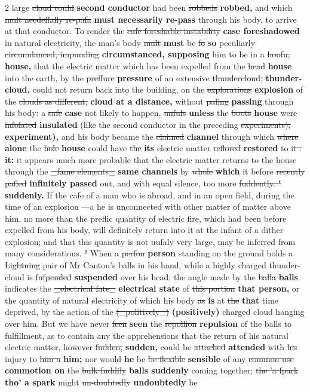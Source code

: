 \documentclass[10pt]{article}
\begin{document}
\begin{multicols}{2}
large \sout{cloud could} \textbf{second conductor} had been \sout{robbeds} \textbf{robbed,} and which \sout{mult needeffally re-pafa} \textbf{must necessarily re-pass} through his body, to arrive at that conductor. To render the \sout{cafe foreshable instability} \textbf{case foreshadowed} in natural electricity, the man's body \sout{mult} \textbf{must} be \sout{fo} \textbf{so} peculiarly \sout{circumdanced, impunding} \textbf{circumstanced, supposing} him to be in a \sout{hoofu,} \textbf{house,} that the electric matter which has been expelled from the \sout{head} \textbf{house} into the earth, by the \sout{preffure} \textbf{pressure} of an extensive \sout{thundercloud,} \textbf{thunder-cloud,} could not return back into the building, on the \sout{explorations} \textbf{explosion} of the \sout{clouds as different,} \textbf{cloud at a distance,} without \sout{paling} \textbf{passing} through his body: a \sout{safe} \textbf{case} not likely to happen, \sout{unfuls} \textbf{unless} the \sout{boots} \textbf{house} were \sout{infolated} \textbf{insulated} (like the second conductor in the preceding \sout{experiments),} \textbf{experiment),} and his body became the \sout{claimed} \textbf{channel} through which \sout{where} \textbf{alone} the \sout{hole} \textbf{house} could have \sout{the} \textbf{its} electric matter \sout{reflored} \textbf{restored} to \sout{it :} \textbf{it:} it appears much more probable that the electric matter returns to the house through the \sout{\_fame elements\_} \textbf{same channels} by \sout{whole} \textbf{which} it before \sout{recently pafled} \textbf{infinitely passed} out, and with equal silence, too more \sout{fuddently. "} \textbf{suddenly.} If the cafe of a man who is abroad, and in an open field, during the time of an explosion —a he is unconnected with other matter of matter above him, no more than the preflic quantity of electric fire, which had been before expelled from his body, will definitely return into it at the infant of a dither explosion; and that this quantity is not uufaly very large, may be inferred from many considerations. \sout{"} When a \sout{perfon} \textbf{person} standing on the ground holds a \sout{Lightning} pair of Mr Canton's balls in his hand, while a highly charged thunder-cloud is \sout{fufpended} \textbf{suspended} over his head; the angle made by the \sout{balla} \textbf{balls} indicates the \sout{\_electrical fate\_} \textbf{electrical state} of \sout{this portion} \textbf{that person,} or the quantity of natural electricity of which his body \sout{as} \textbf{is} at \sout{the} \textbf{that} time deprived, by the action of the \sout{(\_politively\_)} \textbf{(positively)} charged cloud hanging over him. But we have never \sout{feen} \textbf{seen} the \sout{repollion} \textbf{repulsion} of the balls to fulfillment, as to contain any the apprehensions that the return of his natural electric matter, however \sout{fudden,} \textbf{sudden,} could be \sout{attached} \textbf{attended} with \sout{his} injury to \sout{him a} \textbf{him;} nor would \textbf{he} be \sout{be flexible} \textbf{sensible} of any \sout{common use} \textbf{commotion on} the \sout{bulk fuddily} \textbf{balls suddenly} coming together; \sout{the 'a fpark} \textbf{tho' a spark} might \sout{un-doubtedly} \textbf{undoubtedly} be 
\end{multicols}
\end{document}
